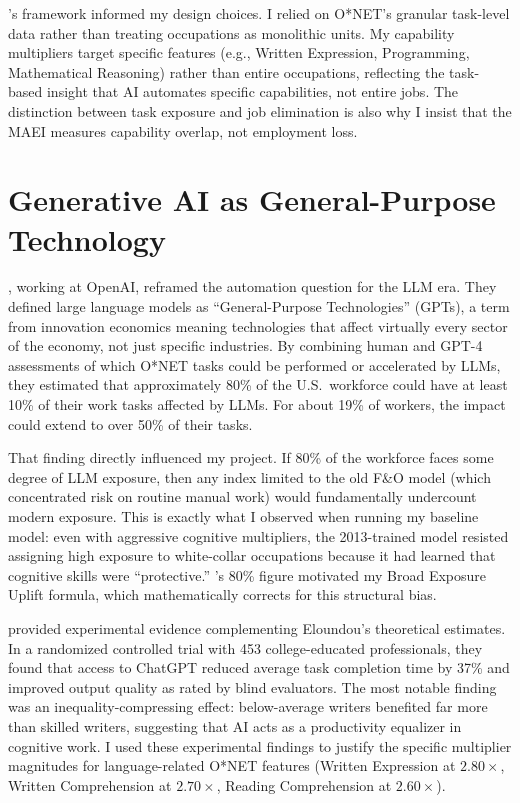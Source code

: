 \citeauthor{Acemoglu_Restrepo_2018}'s framework informed my design choices. I relied on O*NET's granular task-level data rather than treating occupations as monolithic units. My capability multipliers target specific features (e.g., Written Expression, Programming, Mathematical Reasoning) rather than entire occupations, reflecting the task-based insight that AI automates specific capabilities, not entire jobs. The distinction between task exposure and job elimination is also why I insist that the MAEI measures capability overlap, not employment loss.

\section{Generative AI as General-Purpose Technology}
\label{sec:gpt-technology}

\citet{Eloundou_Manning_2023}, working at OpenAI, reframed the automation question for the LLM era. They defined large language models as ``General-Purpose Technologies'' (GPTs), a term from innovation economics meaning technologies that affect virtually every sector of the economy, not just specific industries. By combining human and GPT-4 assessments of which O*NET tasks could be performed or accelerated by LLMs, they estimated that approximately 80\% of the U.S.\ workforce could have at least 10\% of their work tasks affected by LLMs. For about 19\% of workers, the impact could extend to over 50\% of their tasks.

That finding directly influenced my project. If 80\% of the workforce faces some degree of LLM exposure, then any index limited to the old F\&O model (which concentrated risk on routine manual work) would fundamentally undercount modern exposure. This is exactly what I observed when running my baseline model: even with aggressive cognitive multipliers, the 2013-trained model resisted assigning high exposure to white-collar occupations because it had learned that cognitive skills were ``protective.'' \citet{Eloundou_Manning_2023}'s 80\% figure motivated my Broad Exposure Uplift formula, which mathematically corrects for this structural bias.

\citet{Noy_Zhang_2023} provided experimental evidence complementing Eloundou's theoretical estimates. In a randomized controlled trial with 453 college-educated professionals, they found that access to ChatGPT reduced average task completion time by 37\% and improved output quality as rated by blind evaluators. The most notable finding was an inequality-compressing effect: below-average writers benefited far more than skilled writers, suggesting that AI acts as a productivity equalizer in cognitive work. I used these experimental findings to justify the specific multiplier magnitudes for language-related O*NET features (Written Expression at $2.80\times$, Written Comprehension at $2.70\times$, Reading Comprehension at $2.60\times$).

